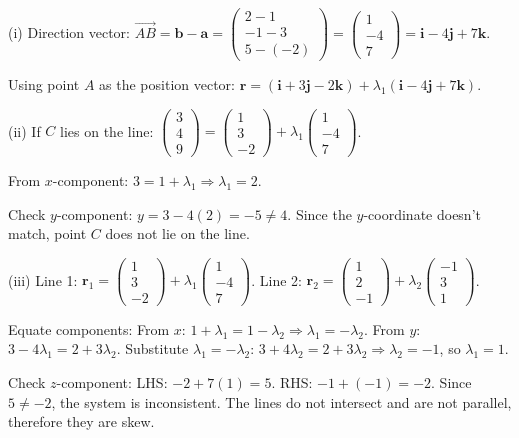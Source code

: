 \begin{solution}[Sketch]
(i) Direction vector: $\overrightarrow{AB} = \mathbf{b} - \mathbf{a} = \begin{pmatrix} 2-1 \\ -1-3 \\ 5-(-2) \end{pmatrix} = \begin{pmatrix} 1 \\ -4 \\ 7 \end{pmatrix} = \mathbf{i} - 4\mathbf{j} + 7\mathbf{k}$. 

Using point $A$ as the position vector: $\mathbf{r} = (\mathbf{i} + 3\mathbf{j} - 2\mathbf{k}) + \lambda_1 (\mathbf{i} - 4\mathbf{j} + 7\mathbf{k})$.

(ii) If $C$ lies on the line: $\begin{pmatrix} 3 \\ 4 \\ 9 \end{pmatrix} = \begin{pmatrix} 1 \\ 3 \\ -2 \end{pmatrix} + \lambda_1 \begin{pmatrix} 1 \\ -4 \\ 7 \end{pmatrix}$.

From $x$-component: $3 = 1 + \lambda_1 \Rightarrow \lambda_1 = 2$.

Check $y$-component: $y = 3 - 4(2) = -5 \neq 4$. Since the $y$-coordinate doesn't match, point $C$ does not lie on the line.

(iii) Line 1: $\mathbf{r}_1 = \begin{pmatrix} 1 \\ 3 \\ -2 \end{pmatrix} + \lambda_1 \begin{pmatrix} 1 \\ -4 \\ 7 \end{pmatrix}$. Line 2: $\mathbf{r}_2 = \begin{pmatrix} 1 \\ 2 \\ -1 \end{pmatrix} + \lambda_2 \begin{pmatrix} -1 \\ 3 \\ 1 \end{pmatrix}$.

Equate components: From $x$: $1 + \lambda_1 = 1 - \lambda_2 \Rightarrow \lambda_1 = -\lambda_2$. From $y$: $3 - 4\lambda_1 = 2 + 3\lambda_2$. Substitute $\lambda_1 = -\lambda_2$: $3 + 4\lambda_2 = 2 + 3\lambda_2 \Rightarrow \lambda_2 = -1$, so $\lambda_1 = 1$.

Check $z$-component: LHS: $-2 + 7(1) = 5$. RHS: $-1 + (-1) = -2$. Since $5 \neq -2$, the system is inconsistent. The lines do not intersect and are not parallel, therefore they are skew.
\end{solution}

